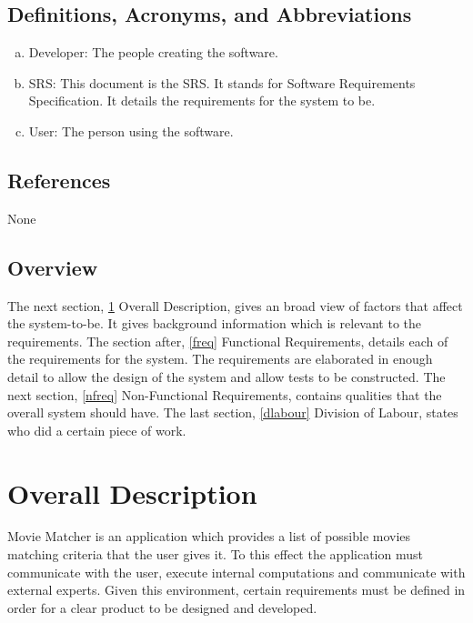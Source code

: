 \documentclass[]{article}
\begin{document}
\subsection{Definitions, Acronyms, and Abbreviations}
\label{sub:definitions_acronyms_and_abbreviations}
\begin{enumerate}[a)]
	\item Developer: The people creating the software.
	\item SRS: This document is the SRS. It stands for Software Requirements Specification. It details the requirements for the system to be.
	\item User: The person using the software.
\end{enumerate}

\subsection{References}
\label{sub:references}
None

\subsection{Overview}
\label{sub:overview}
The next section, \ref{odesc} Overall Description, gives an broad view of factors that affect the system-to-be. It gives background information which is relevant to the requirements. The section after, \ref{freq} Functional Requirements, details each of the requirements for the system. The requirements are elaborated in enough detail to allow the design of the system and allow tests to be constructed. The next section, \ref{nfreq} Non-Functional Requirements, contains qualities that the overall system should have. The last section, \ref{dlabour} Division of Labour, states who did a certain piece of work.


\section{Overall Description} \label{odesc}
\label{sec:overall_description}
Movie Matcher is an application which provides a list of possible movies matching criteria that the user
gives it. To this effect the application must communicate with the user, execute internal computations and
communicate with external experts.
Given this environment, certain requirements must be defined in order for a clear product to be designed
and developed.
\end{document}
